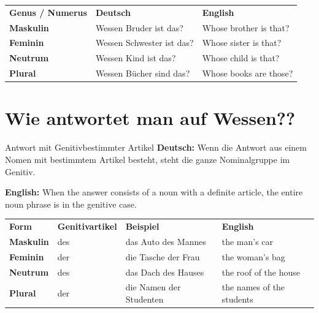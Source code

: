 \documentclass[a4paper,11pt]{article}
\newcommand{\GermanText}[1]{\textbf{Deutsch: }#1\par}
\newcommand{\EnglishText}[1]{{\small\color{SoftGray}\textbf{English: }#1\par}}
\begin{document}
        \begin{longtable}{>{\bfseries}p{3.0cm}|p{5.5cm}|p{5.0cm}}
            \rowcolor{HeaderBlueDark}
            \color{white}\textbf{Genus / Numerus} &
            \color{white}\textbf{Deutsch} &
            \color{white}\textbf{English} \\
            
            Maskulin &
            Wessen Bruder ist das? &
            Whose brother is that? \\
            
            Feminin &
            Wessen Schwester ist das? &
            Whose sister is that? \\
            
            Neutrum &
            Wessen Kind ist das? &
            Whose child is that? \\
            
            Plural &
            Wessen Bücher sind das? &
            Whose books are those? \\
        \end{longtable}
    
    
    \section{Wie antwortet man auf \glqq Wessen?\grqq?}
        
        \begin{grammarentry}{Antwort mit Genitiv}{bestimmter Artikel}
            \GermanText{Wenn die Antwort aus einem Nomen mit bestimmtem Artikel besteht, steht die ganze Nominalgruppe im Genitiv.}
            \EnglishText{When the answer consists of a noun with a definite article, the entire noun phrase is in the genitive case.}
        \end{grammarentry}
        
        \begin{longtable}{>{\bfseries}p{2.5cm}|p{3.3cm}|p{4.1cm}|p{4.1cm}}
            \rowcolor{HeaderBlueDark}
            \color{white}\textbf{Form} &
            \color{white}\textbf{Genitivartikel} &
            \color{white}\textbf{Beispiel} &
            \color{white}\textbf{English} \\
            
            Maskulin &
            des &
            das Auto des Mannes &
            the man's car \\
            
            Feminin &
            der &
            die Tasche der Frau &
            the woman's bag \\
            
            Neutrum &
            des &
            das Dach des Hauses &
            the roof of the house \\
            
            Plural &
            der &
            die Namen der Studenten &
            the names of the students \\
        \end{longtable}
    
\end{document}
